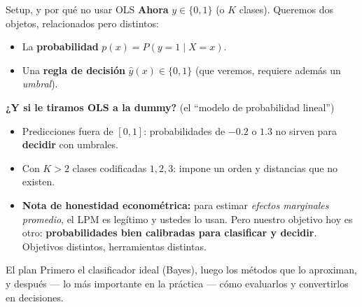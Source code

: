 \documentclass{beamer}
\newcommand{\1}{\mathbb{I}}
\begin{document}
\begin{frame}{Setup, y por qué no usar OLS}
\small
\textbf{Ahora} $y \in \{0, 1\}$ (o $K$ clases). Queremos dos objetos, relacionados pero distintos:
\begin{itemize}\itemsep3pt
  \item La \textbf{probabilidad} $p(x) = P(y = 1 \mid X = x)$.
  \item Una \textbf{regla de decisión} $\hat{y}(x) \in \{0,1\}$ (que veremos, requiere además un \emph{umbral}).
\end{itemize}
\pause

\vspace{0.15cm}
\textbf{¿Y si le tiramos OLS a la dummy?} (el ``modelo de probabilidad lineal'')
\begin{itemize}\itemsep4pt
  \item Predicciones fuera de $[0,1]$: probabilidades de $-0.2$ o $1.3$ no sirven para \textbf{decidir} con umbrales.
  \item Con $K > 2$ clases codificadas $1, 2, 3$: impone un orden y distancias que no existen. \pause
  \item \textbf{Nota de honestidad econométrica:} para estimar \emph{efectos marginales promedio}, el LPM es legítimo y ustedes lo usan. Pero nuestro objetivo hoy es otro: \textbf{probabilidades bien calibradas para clasificar y decidir}. Objetivos distintos, herramientas distintas.
\end{itemize}
\pause

\begin{block}{El plan}
Primero el clasificador ideal (Bayes), luego los métodos que lo aproximan, y después --- lo más importante en la práctica --- cómo evaluarlos y convertirlos en decisiones.
\end{block}
\end{frame}
\end{document}
